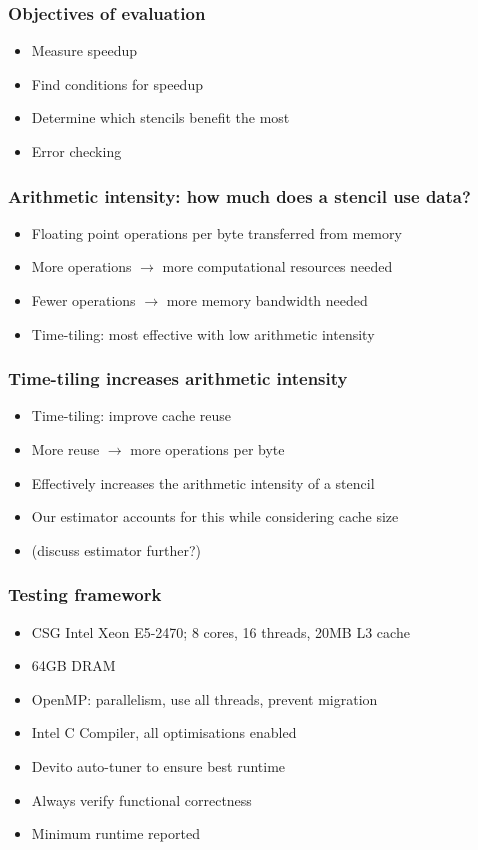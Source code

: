 \documentclass{beamer}
\begin{document}
\begin{frame}
\frametitle{Objectives of evaluation}

\begin{itemize}
	\item Measure speedup
	\item Find conditions for speedup
	\item Determine which stencils benefit the most
	\item Error checking
\end{itemize}
\end{frame}



\begin{frame}
\frametitle{Arithmetic intensity: how much does a stencil use data?}

\begin{itemize}
	\item Floating point operations per byte transferred from memory
	\item More operations \(\rightarrow\) more computational resources needed
	\item Fewer operations \(\rightarrow\) more memory bandwidth needed
	\item Time-tiling: most effective with low arithmetic intensity
\end{itemize}
\end{frame}



\begin{frame}
\frametitle{Time-tiling increases arithmetic intensity}

\begin{itemize}
	\item Time-tiling: improve cache reuse
	\item More reuse \(\rightarrow\) more operations per byte
	\item Effectively increases the arithmetic intensity of a stencil
	\item Our estimator accounts for this while considering cache size
	\item (discuss estimator further?)
\end{itemize}
\end{frame}



\begin{frame}
\frametitle{Testing framework}

\begin{itemize}
	\item CSG Intel Xeon E5-2470; 8 cores, 16 threads, 20MB L3 cache
	\item 64GB DRAM
	\item OpenMP: parallelism, use all threads, prevent migration
	\item Intel C Compiler, all optimisations enabled
	\item Devito auto-tuner to ensure best runtime
	\item Always verify functional correctness
	\item Minimum runtime reported
\end{itemize}
\end{frame}
\end{document}
